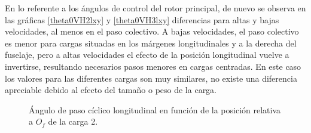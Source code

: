 En lo referente a los ángulos de control del rotor principal, de nuevo se observa en las gráficas \ref{theta0VH2lxy} y \ref{theta0VH3lxy} diferencias para altas y bajas velocidades, al menos en el paso colectivo. A bajas velocidades, el paso colectivo es menor para cargas situadas en los márgenes longitudinales y a la derecha del fuselaje, pero a altas velocidades el efecto de la posición longitudinal vuelve a invertirse, resultando necesarios pasos menores en cargas centradas. En este caso los valores para las diferentes cargas son muy similares, no existe una diferencia apreciable debido al efecto del tamaño o peso de la carga.

\begin{figure}
	\centering
	\caption{Ángulo de paso cíclico longitudinal en función de la posición relativa a $O_f$ de la carga 2.}
	\label{theta1CVC2lxy}
\end{figure}
